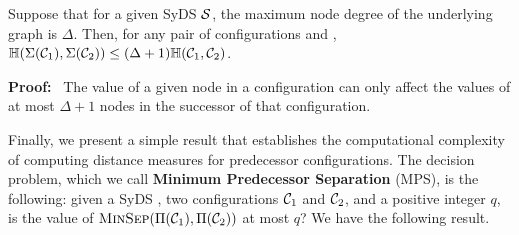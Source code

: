 
\smallskip

\begin{proposition}\label{pro:far-close-lower-bound}
Suppose that for a given SyDS $\mbox{$\mathcal{S}$}${},
the maximum node degree of the underlying graph is $\Delta$.
 Then, for any pair of configurations
\calcone{} and \calctwo{},
 $\mbox{$\mathbb{H}$}(\Sigma(\mbox{$\mathcal{C}_{1}$}), \Sigma(\mbox{$\mathcal{C}_{2}$})) \leq (\Delta+1) \mbox{$\mathbb{H}$}(\mbox{$\mathcal{C}_{1}$}, \mbox{$\mathcal{C}_{2}$})$.\end{proposition}

\noindent
\textbf{Proof:}~ 
The value of a given node in a configuration can only affect the values of at most $\Delta +1$
nodes in the successor of that configuration.
\QED





\newcommand{\mps}{\mbox{MPS}}
\newcommand{\mpsgp}{\mbox{MPSGP}}
\newcommand{\pre}{\mbox{PRE}}

\smallskip

Finally, we present a simple result that establishes the computational complexity
of computing distance measures for predecessor configurations.
The decision problem, which we call \textbf{Minimum Predecessor Separation} (\mps),
is the following: given a SyDS \cals{}, two configurations $\mbox{$\mathcal{C}_{1}$}{}$ and
$\mbox{$\mathcal{C}_{2}$}{}$, and a positive integer $q$, is the value of
$\mbox{\textsc{MinSep}}(\Pi(\mbox{$\mathcal{C}_{1}$}), \Pi(\mbox{$\mathcal{C}_{2}$}))$ at most $q$?
We have the following result.

